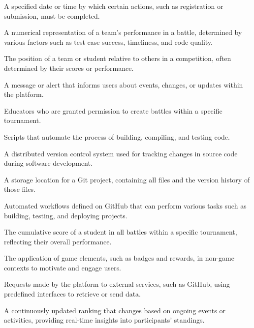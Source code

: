 \begin{description}[leftmargin=0pt]
    \item[Deadline:] A specified date or time by which certain actions, such as registration or submission, must be completed.

    \item[Score:] A numerical representation of a team's performance in a battle, determined by various factors such as test case success, timeliness, and code quality.

    \item[Rank:] The position of a team or student relative to others in a competition, often determined by their scores or performance.

    \item[Notification:] A message or alert that informs users about events, changes, or updates within the platform.

    \item[Collaborators:] Educators who are granted permission to create battles within a specific tournament.

    \item[Build Automation Scripts:] Scripts that automate the process of building, compiling, and testing code.

    \item[Git:] A distributed version control system used for tracking changes in source code during software development. \cite{Git}

    \item[Git Repository:] A storage location for a Git project, containing all files and the version history of those files.

    \item[GitHub Actions:] Automated workflows defined on GitHub that can perform various tasks such as building, testing, and deploying projects.

    \item[Personal Tournament Score:] The cumulative score of a student in all battles within a specific tournament, reflecting their overall performance.

    \item[Gamification:] The application of game elements, such as badges and rewards, in non-game contexts to motivate and engage users.

    \item[API Calls:] Requests made by the platform to external services, such as GitHub, using predefined interfaces to retrieve or send data.

    \item[Dynamic Ranking:] A continuously updated ranking that changes based on ongoing events or activities, providing real-time insights into participants' standings.

\end{description}

